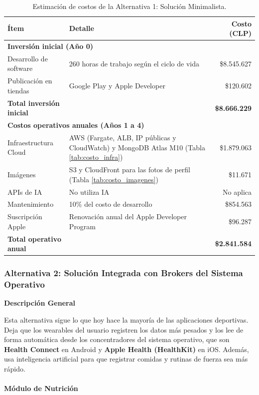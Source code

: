 \begin{table}[h!]
    \centering
    \renewcommand{\arraystretch}{1.4}
    \begin{tabular}{|m{4cm}|m{5.5cm}|r|}
        \hline
        \rowcolor[HTML]{EFEFEF}
        \textbf{Ítem} & \textbf{Detalle} & \textbf{Costo (CLP)} \\ \hline
        \multicolumn{3}{|l|}{\cellcolor[HTML]{E3F2FD}\textbf{Inversión inicial (Año 0)}} \\ \hline
        Desarrollo de software & 260 horas de trabajo según el ciclo de vida & \$8.545.627 \\ \hline
        Publicación en tiendas & Google Play y Apple Developer & \$120.602 \\ \hline
        \rowcolor[HTML]{E8F5E9}
        \textbf{Total inversión inicial} & & \textbf{\$8.666.229} \\ \hline
        \multicolumn{3}{|l|}{\cellcolor[HTML]{FFF3E0}\textbf{Costos operativos anuales (Años 1 a 4)}} \\ \hline
        Infraestructura Cloud & AWS (Fargate, ALB, IP públicas y CloudWatch) y MongoDB Atlas M10 (Tabla \ref{tab:costo_infra}) & \$1.879.063 \\ \hline
        Imágenes & S3 y CloudFront para las fotos de perfil (Tabla \ref{tab:costo_imagenes}) & \$11.671 \\ \hline
        APIs de IA & No utiliza IA & No aplica \\ \hline
        Mantenimiento & 10\% del costo de desarrollo & \$854.563 \\ \hline
        Suscripción Apple & Renovación anual del Apple Developer Program & \$96.287 \\ \hline
        \rowcolor[HTML]{FFF3E0}
        \textbf{Total operativo anual} & & \textbf{\$2.841.584} \\ \hline
    \end{tabular}
    \caption{Estimación de costos de la Alternativa 1: Solución Minimalista.}
    \label{tab:costos_alt1}
\end{table}
\newpage
\subsubsection{Alternativa 2: Solución Integrada con Brokers del Sistema Operativo}

\textbf{Descripción General}

Esta alternativa sigue lo que hoy hace la mayoría de las aplicaciones deportivas. Deja que los wearables del usuario registren los datos más pesados y los lee de forma automática desde los concentradores del sistema operativo, que son \textbf{Health Connect} en Android y \textbf{Apple Health (HealthKit)} en iOS. Además, usa inteligencia artificial para que registrar comidas y rutinas de fuerza sea más rápido.
\\\\
\textbf{Módulo de Nutrición}

